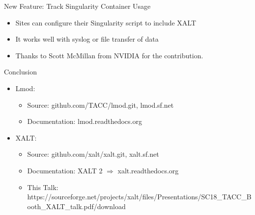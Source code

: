 \documentclass{beamer}
\begin{document}
\begin{frame}{New Feature: Track Singularity Container Usage}
  \begin{itemize}
    \item Sites can configure their Singularity script to include XALT
    \item It works well with syslog or file transfer of data
    \item Thanks to Scott McMillan from NVIDIA for the contribution.
  \end{itemize}
\end{frame}

\begin{frame}{Conclusion}
  \begin{itemize}
    \item Lmod:
      \begin{itemize}
        \item Source: github.com/TACC/lmod.git, lmod.sf.net
        \item Documentation: lmod.readthedocs.org
      \end{itemize}
    \item XALT:
      \begin{itemize}
        \item Source: github.com/xalt/xalt.git, xalt.sf.net
        \item Documentation: XALT 2 $\Rightarrow$ xalt.readthedocs.org
        \item This Talk: https://sourceforge.net/projects/xalt/files/Presentations/SC18\_TACC\_Booth\_XALT\_talk.pdf/download
      \end{itemize}
  \end{itemize}
\end{frame}

%
\end{document}
